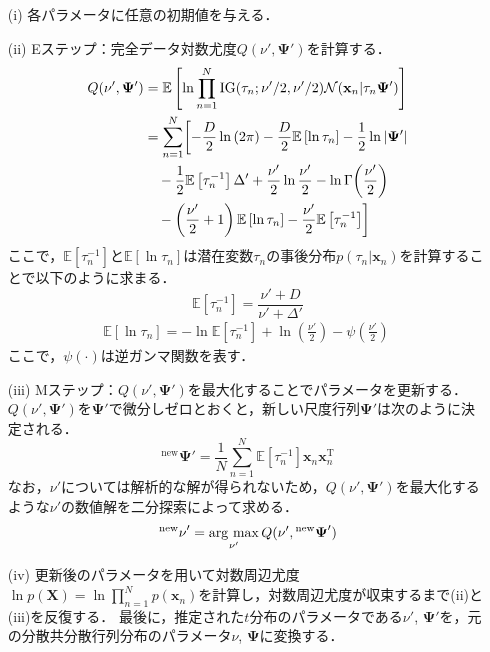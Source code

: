 \documentclass[journal]{IEEEtran}
\newcommand{\argmax}{\mathop{\rm arg\ max}\limits}
\begin{document}
\begin{enumerate}
\setlength{\parskip}{0cm} %
\setlength{\itemsep}{0cm} %
\item[(i)] 各パラメータに任意の初期値を与える．
\item[(ii)] Eステップ：完全データ対数尤度$Q(\nu',\bm \Psi')$を計算する．
\begin{align}%
  Q(\nu',\bm{\Psi}')&=\mathbb{E} \left[\ln{\prod_{n=1}^{N}\mathrm{IG}(\tau_n;\nu'/2,\nu'/2) \mathcal{N}(\mathbf{x}_n|\tau_n \bm{\Psi}')}\right]  \notag  \\
  &=\sum_{n=1}^{N} \biggl[-\frac{D}{2}\ln{(2\pi)}-\frac{D}{2}\mathbb{E}\left[\ln{\tau_n}\right]-\frac{1}{2}\ln{|\bm \Psi'|} \notag \\
  &\quad-\frac{1}{2}\mathbb{E}\left[\tau^{-1}_n\right]\Delta'+\frac{\nu'}{2} \ln{\frac{\nu'}{2}} - \ln{\Gamma{\left(\frac{\nu'}{2}\right)}} \notag \\
  &\quad- \left(\frac{\nu'}{2}+1\right)\mathbb{E}\left[\ln{\tau_n}\right]-\frac{\nu'}{2}\mathbb{E}\left[\tau^{-1}_n \right] \biggr]
\end{align}
ここで，$\mathbb{E}\left[\tau^{-1}_n\right]$と$\mathbb{E}\left[\ln{\tau_n}\right]$は潜在変数$\tau_n$の事後分布$p(\tau_n|\mathbf{x}_n)$を計算することで以下のように求まる．
\begin{equation}%
\mathbb{E}\left[\tau^{-1}_n\right]=\frac{\nu'+D}{\nu'+\Delta'}
\end{equation}
\begin{eqnarray}%
&\mathbb{E}\left[\ln{\tau_n}\right]=-\ln{\mathbb{E}\left[\tau^{-1}_n\right]}+\ln{\left(\frac{\nu'}{2}\right)}-{\psi}\left(\frac{\nu'}{2}\right)\quad
\end{eqnarray}
ここで，$\psi(\cdot)$は逆ガンマ関数を表す．
\item[(iii)] Mステップ：$Q(\nu', \bm \Psi')$を最大化することでパラメータを更新する．$Q(\nu', \bm \Psi')$を$\bm \Psi'$で微分しゼロとおくと，新しい尺度行列$\bm \Psi'$は次のように決定される．
\begin{equation}%
{^\mathrm{new} {\bm \Psi}}' = \frac{1}{N} \sum_{n=1}^{N} \mathbb{E}\left[\tau^{-1}_n\right] \mathbf{x}_n \mathbf{x}_n^\mathrm{T}
\end{equation}
なお，$\nu'$については解析的な解が得られないため，$Q(\nu', \bm \Psi')$を最大化するような$\nu'$の数値解を二分探索によって求める．
\begin{equation}%
{^\mathrm{new} \nu}' = \argmax_{\nu'}  Q(\nu', {^\mathrm{new} {\bm \Psi}}')
\end{equation}
\item[(iv)] 更新後のパラメータを用いて対数周辺尤度$\ln{p(\mathbf{X})} = \ln{\prod_{n=1}^N p(\mathbf{x}_n)}$を計算し，対数周辺尤度が収束するまで(ii)と(iii)を反復する．
最後に，推定された$t$分布のパラメータである$\nu'$, $\bm \Psi'$を，元の分散共分散行列分布のパラメータ$\nu$, $\bm \Psi$に変換する．
\end{enumerate}
\end{document}
